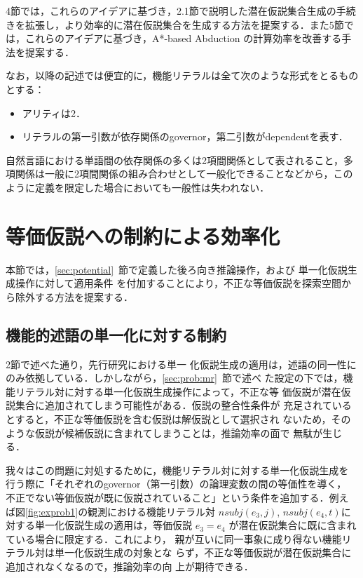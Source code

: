 \documentclass[japanese]{jnlp_1.4}
\begin{document}
4節では，これらのアイデアに基づき，2.1節で説明した潜在仮説集合生成の手続
きを拡張し，より効率的に潜在仮説集合を生成する方法を提案する．また5節で
は，これらのアイデアに基づき，A*-based
Abduction \cite{Yamamoto15} の計算効率を改善する手法を提案する．


なお，以降の記述では便宜的に，機能リテラルは全て次のような形式をとるものとする：
\begin{itemize}
\item アリティは2．
\item リテラルの第一引数が依存関係のgovernor，第二引数がdependentを表す．
\end{itemize}
自然言語における単語間の依存関係の多くは2項間関係として表されること，多
項関係は一般に2項間関係の組み合わせとして一般化できることなどから，この
ように定義を限定した場合においても一般性は失われない．



\section{等価仮説への制約による効率化}

本節では，\ref{sec:potential}~節で定義した後ろ向き推論操作，および
単一化仮説生成操作に対して適用条件
を付加することにより，不正な等価仮説を探索空間から除外する方法を提案する．


\subsection{機能的述語の単一化に対する制約}
\label{sec:cons-unify}

2節で述べた通り，先行研究\cite{Inoue11,Inoue12,Yamamoto15}における単一
化仮説生成の適用は，述語の同一性にのみ依拠している．しかしながら，\ref{sec:prob:mr}~節で述べ
た設定の下では，機能リテラル対に対する単一化仮説生成操作によって，不正な等
価仮説が潜在仮説集合に追加されてしまう可能性がある．仮説の整合性条件が
充足されているとすると，不正な等価仮説を含む仮説は解仮説として選択され
ないため，そのような仮説が候補仮説に含まれてしまうことは，推論効率の面で
無駄が生じる．

我々はこの問題に対処するために，機能リテラル対に対する単一化仮説生成を
行う際に「それぞれのgovernor（第一引数）の論理変数の間の等価性を導く，
不正でない等価仮説が既に仮説されていること」という条件を追加する．例え
ば図\ref{fig:exprob1}の観測における機能リテラル対
$\mathit{nsubj}(e_3,j)$, $\mathit{nsubj}(e_4,t)$に対する単一化仮説生成の適用は，等価仮説
$e_3=e_4$ が潜在仮説集合に既に含まれている場合に限定する．これにより，
親が互いに同一事象に成り得ない機能リテラル対は単一化仮説生成の対象とな
らず，不正な等価仮説が潜在仮説集合に追加されなくなるので，推論効率の向
上が期待できる．
\end{document}
